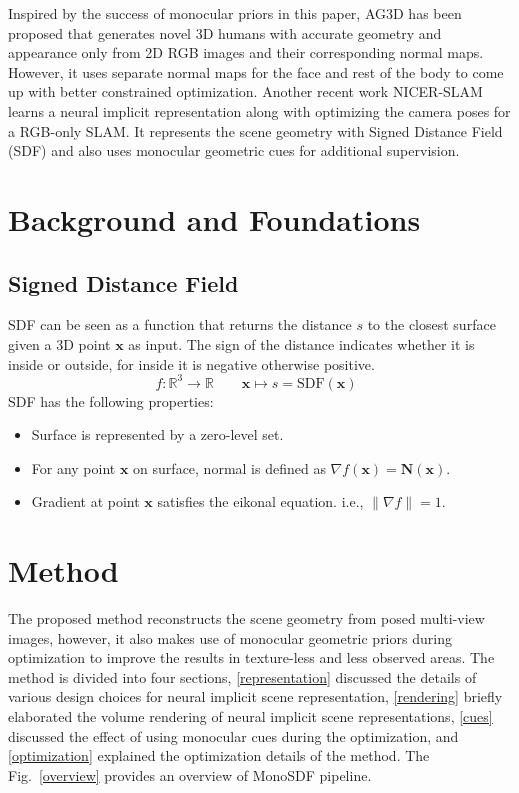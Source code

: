 \documentclass[a4paper]{paper}
\newcommand{\figref}[1]{Fig.~\ref{#1}}
\begin{document}
Inspired by the success of monocular priors in this paper, AG3D \cite{dong2023ag3d} has been proposed that generates novel 3D humans with accurate geometry and appearance only from 2D RGB images and their corresponding normal maps. However, it uses separate normal maps for the face and rest of the body to come up with better constrained optimization. Another recent work NICER-SLAM \cite{zhu2023nicer} learns a neural implicit representation along with optimizing the camera poses for a RGB-only SLAM. It represents the scene geometry with Signed Distance Field (SDF) and also uses monocular geometric cues for additional supervision.

\section{Background and Foundations}
\subsection{Signed Distance Field}\label{sdf}
SDF can be seen as a function that returns the distance $s$ to the closest surface given a 3D point $\mathbf{x}$ as input. The sign of the distance indicates whether it is inside or outside, for inside it is negative otherwise positive.
\begin{equation}
f: \mathbb{R}^3 \to \mathbb{R} \quad\quad\mathbf{x} \mapsto s = \text{SDF}(\mathbf{x}) \enspace 
\label{SDF}
\end{equation}
SDF has the following properties:
\vspace{-.05cm}\begin{itemize}
    \setlength\itemsep{-.08em}
    \item Surface is represented by a zero-level set.
    \item For any point $\mathbf{x}$ on surface, normal is defined as $\nabla f(\mathbf{x}) = \mathbf{N}(\mathbf{x})$.
    \item Gradient at point $\mathbf{x}$ satisfies the eikonal equation. i.e., $\lVert\nabla f \rVert = 1$.
\end{itemize}

\section{Method}
The proposed method reconstructs the scene geometry from posed multi-view images, however, it also makes use of monocular geometric priors during optimization to improve the results in texture-less and less observed areas. The method is divided into four sections, \ref{representation} discussed the details of various design choices for neural implicit scene representation, \ref{rendering} briefly elaborated the volume rendering of neural implicit scene representations, \ref{cues} discussed the effect of using monocular cues during the optimization, and \ref{optimization} explained the optimization details of the method. The \figref{overview} provides an overview of MonoSDF pipeline.
\end{document}

